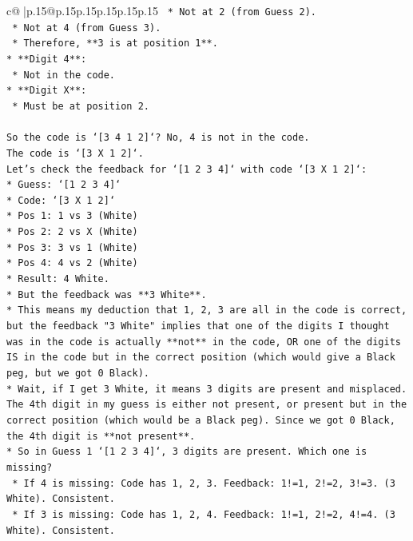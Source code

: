 \documentclass{article}
\begin{document}
{\begin{supertabular}{c@{$\;$}|p{.15\linewidth}@{}p{.15\linewidth}p{.15\linewidth}p{.15\linewidth}p{.15\linewidth}p{.15\linewidth}}
{{{\texttt{    *   Not at 2 (from Guess 2).} \\
\texttt{    *   Not at 4 (from Guess 3).} \\
\texttt{    *   Therefore, **3 is at position 1**.} \\
\texttt{*   **Digit 4**:} \\
\texttt{    *   Not in the code.} \\
\texttt{*   **Digit X**:} \\
\texttt{    *   Must be at position 2.} \\
\\ 
\texttt{So the code is `{[}3 4 1 2{]}`? No, 4 is not in the code.} \\
\texttt{The code is `{[}3 X 1 2{]}`.} \\
\texttt{Let's check the feedback for `{[}1 2 3 4{]}` with code `{[}3 X 1 2{]}`:} \\
\texttt{*   Guess: `{[}1 2 3 4{]}`} \\
\texttt{*   Code: `{[}3 X 1 2{]}`} \\
\texttt{*   Pos 1: 1 vs 3 (White)} \\
\texttt{*   Pos 2: 2 vs X (White)} \\
\texttt{*   Pos 3: 3 vs 1 (White)} \\
\texttt{*   Pos 4: 4 vs 2 (White)} \\
\texttt{*   Result: 4 White.} \\
\texttt{*   But the feedback was **3 White**.} \\
\texttt{*   This means my deduction that 1, 2, 3 are all in the code is correct, but the feedback "3 White" implies that one of the digits I thought was in the code is actually **not** in the code, OR one of the digits IS in the code but in the correct position (which would give a Black peg, but we got 0 Black).} \\
\texttt{*   Wait, if I get 3 White, it means 3 digits are present and misplaced. The 4th digit in my guess is either not present, or present but in the correct position (which would be a Black peg). Since we got 0 Black, the 4th digit is **not present**.} \\
\texttt{*   So in Guess 1 `{[}1 2 3 4{]}`, 3 digits are present. Which one is missing?} \\
\texttt{    *   If 4 is missing: Code has 1, 2, 3. Feedback: 1!=1, 2!=2, 3!=3. (3 White). Consistent.} \\
\texttt{    *   If 3 is missing: Code has 1, 2, 4. Feedback: 1!=1, 2!=2, 4!=4. (3 White). Consistent.} \\
}}}
\end{supertabular}}
\end{document}

